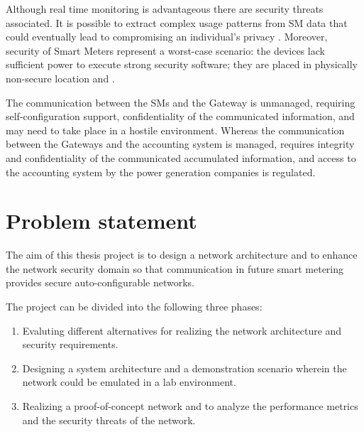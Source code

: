 Although real time monitoring is advantageous there are security threats associated. It is possible to extract complex usage patterns from SM data that could eventually lead to compromising an individual's privacy \cite{Molina_SM_att}. Moreover, security of Smart Meters represent a worst-case scenario: the devices lack sufficient power to execute strong security software; they are placed in physically non-secure location and  .

The communication between the SMs and the Gateway is unmanaged, requiring self-configuration support, confidentiality of the communicated information, and may need to take place in a hostile environment. Whereas the communication between the Gateways and the accounting system is managed, requires integrity and confidentiality of the communicated accumulated information, and access to the accounting system by the power generation companies is regulated.

\section{Problem statement}
The aim of this thesis project is to design a network architecture and to enhance the network security domain so that communication in future smart metering provides secure auto-configurable networks.

The project can be divided into the following three phases:
\begin{enumerate}
\item Evaluting different alternatives for realizing the network architecture and security requirements.
\item Designing a system architecture and a demonstration scenario wherein the network could be emulated in a lab environment.
\item Realizing a proof-of-concept network and to analyze the performance metrics and the security threats of the network.
\end{enumerate}